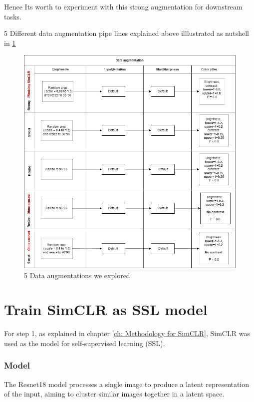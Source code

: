Hence Its worth to experiment with this strong augmentation for downstream tasks.


5 Different data augmentation pipe lines explained above illlustrated as nutshell in \ref{fig:strong_aug}
\begin{figure}[H]
  \centering
  \includegraphics[scale=0.6]{figures/strong_aug.png} 
  \caption{5 Data augmentations we explored}
  \label{fig:strong_aug}
\end{figure}



\section{Train SimCLR as SSL model}

For step 1, as explained in chapter \ref{ch: Methodology for SimCLR}, SimCLR was used as the  model for self-supervised learning (SSL). 




\subsubsection{Model}
The Resnet18 \cite{he2015deepresiduallearningimage} model processes a single image to produce a latent representation of the input, aiming to cluster 
similar images together in a latent space. 

